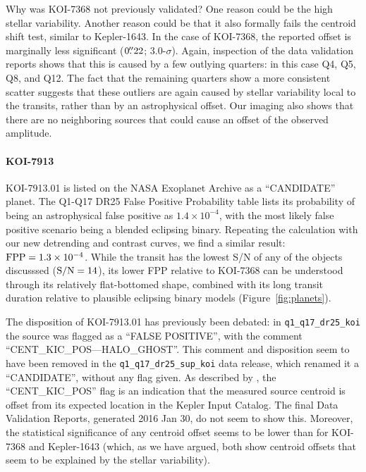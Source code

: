 \documentclass[12pt,twocolumn,linenumbers]{aastex63}
\begin{document}
Why was KOI-7368 not previously validated?  One reason could be the
high stellar variability.  Another reason could be that it also
formally fails the centroid shift test, similar to Kepler-1643.  In
the case of KOI-7368, the reported offset is marginally less
significant ($0\mbox{$.\!\!^{\prime\prime}$}22$; 3.0-$\sigma$).  Again, inspection of the
data validation reports shows that this is caused by a few outlying
quarters: in this case Q4, Q5, Q8, and Q12.  The fact that the
remaining quarters show a more consistent scatter suggests that these
outliers are again caused by stellar variability local to the
transits, rather than by an astrophysical offset.  Our imaging also
shows that there are no neighboring sources that could cause an
offset of the observed amplitude.


\paragraph{KOI-7913}
KOI-7913.01 is listed on the NASA Exoplanet Archive as a ``CANDIDATE''
planet.  The Q1-Q17 DR25 False Positive Probability table lists its
probability of being an astrophysical false positive as
$1.4\times10^{-4}$, with the most likely false positive scenario being
a blended eclipsing binary.  Repeating the calculation with our new
detrending and contrast curves, we find a similar result: ${\rm FPP} =
1.3\times10^{-4}$.  While the transit has the lowest S/N of any of the
objects discusssed (${\rm S/N}=14$), its lower FPP relative to
KOI-7368 can be understood through its relatively flat-bottomed shape,
combined with its long transit duration relative to plausible
eclipsing binary models (Figure~\ref{fig:planets}).

The disposition of KOI-7913.01 has previously been debated:
in \texttt{q1\_q17\_dr25\_koi} the source was flagged as a ``FALSE POSITIVE'',
with the comment ``CENT\_KIC\_POS---HALO\_GHOST''.  This comment and
disposition seem to have been removed in the
\texttt{q1\_q17\_dr25\_sup\_koi} data release, which renamed it a
``CANDIDATE'', without any flag given.  As described by
\citet{thompson_planetary_2018}, the ``CENT\_KIC\_POS'' flag is an
indication that the measured source centroid is offset from its
expected location in the Kepler Input Catalog.  The final Data
Validation Reports, generated 2016 Jan 30, do not seem to show this.
Moreover, the statistical significance of any centroid offset seems to
be lower than for KOI-7368 and Kepler-1643 (which, as we have argued,
both show centroid offsets that seem to be explained by the stellar
variability).
\end{document}
